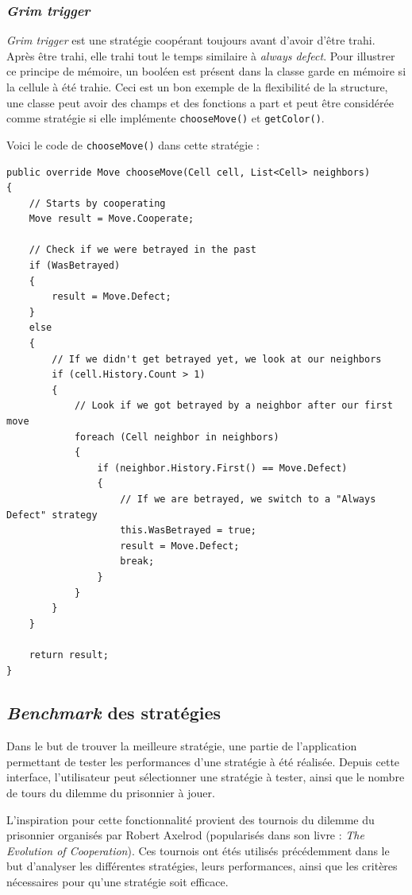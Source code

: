 \documentclass[a4paper]{article}
\begin{document}
\pagebreak{}
\subsubsection{\textit{Grim trigger}}
\textit{Grim trigger} est une stratégie coopérant toujours avant d'avoir d'être trahi. Après être trahi, elle trahi tout le temps similaire à \textit{always defect}. Pour illustrer ce principe de mémoire, un booléen est présent dans la classe garde en mémoire si la cellule à été trahie. Ceci est un bon exemple de la flexibilité de la structure, une classe peut avoir des champs et des fonctions a part et peut être considérée comme stratégie si elle implémente \texttt{chooseMove()} et \texttt{getColor()}.

Voici le code de \texttt{chooseMove()} dans cette stratégie :
\begin{lstlisting}
public override Move chooseMove(Cell cell, List<Cell> neighbors)
{
    // Starts by cooperating
    Move result = Move.Cooperate;

    // Check if we were betrayed in the past
    if (WasBetrayed)
    {
        result = Move.Defect;
    }
    else
    {
        // If we didn't get betrayed yet, we look at our neighbors
        if (cell.History.Count > 1)
        {
            // Look if we got betrayed by a neighbor after our first move
            foreach (Cell neighbor in neighbors)
            {
                if (neighbor.History.First() == Move.Defect)
                {
                    // If we are betrayed, we switch to a "Always Defect" strategy
                    this.WasBetrayed = true;
                    result = Move.Defect;
                    break;
                }
            }
        }
    }

    return result;
}
\end{lstlisting}

\pagebreak
\subsection{\textit{Benchmark} des stratégies}
Dans le but de trouver la meilleure stratégie, une partie de l'application permettant de tester les performances d'une stratégie à été réalisée. Depuis cette interface, l'utilisateur peut sélectionner une stratégie à tester, ainsi que le nombre de tours du dilemme du prisonnier à jouer. 

L'inspiration pour cette fonctionnalité provient des tournois du dilemme du prisonnier organisés par Robert Axelrod (popularisés dans son livre : \textit{The Evolution of Cooperation}\cite{book}). Ces tournois ont étés utilisés précédemment dans le but d'analyser les différentes stratégies, leurs performances, ainsi que les critères nécessaires pour qu'une stratégie soit efficace.
\end{document}
